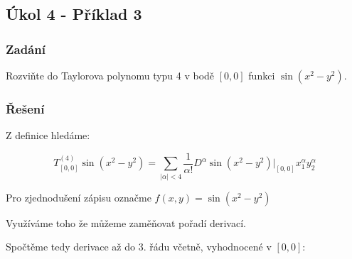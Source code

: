 \documentclass[../main.tex]{subfiles}
\begin{document}
\subsection{Úkol 4 - Příklad 3}
\subsubsection{Zadání}


Rozviňte do Taylorova polynomu typu 4 v bodě $[0,0]$ funkci $\sin (x^2 - y^2)$.


\subsubsection{Řešení}

Z definice hledáme:

\begin{equation*}
    T^{(4)}_{[0,0]} \sin (x^2 - y^2) = \sum_{|\alpha|<4} \frac{1}{\alpha !} D^\alpha \sin (x^2 - y^2) |_{[0,0]} x^\alpha_1 y^\alpha_2
\end{equation*}

Pro zjednodušení zápisu označme $f(x,y) = \sin(x^2 - y^2)$

Využíváme toho že můžeme zaměňovat pořadí derivací.

Spočtěme tedy derivace až do 3. řádu včetně, vyhodnocené v $[0,0]$:

\end{document}
